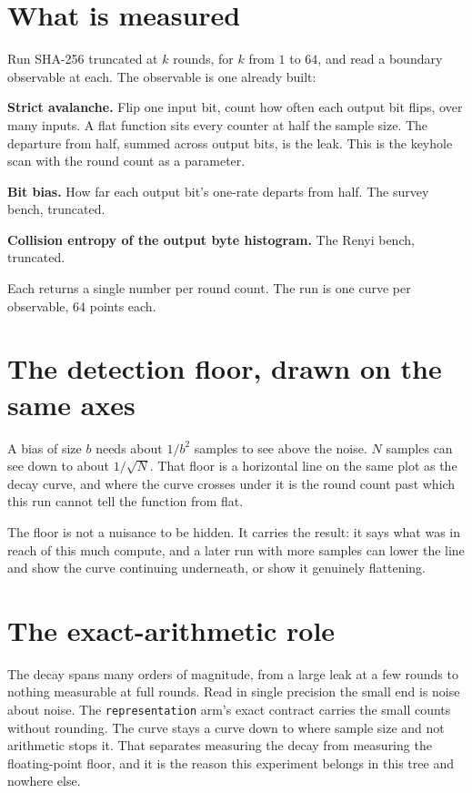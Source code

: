 \section{What is measured}

Run SHA-256 truncated at \(k\) rounds, for \(k\) from \(1\) to \(64\), and read a boundary observable at each. The observable is one already built:

\textbf{Strict avalanche.} Flip one input bit, count how often each output bit flips, over many inputs. A flat function sits every counter at half the sample size. The departure from half, summed across output bits, is the leak. This is the keyhole scan with the round count as a parameter.

\textbf{Bit bias.} How far each output bit's one-rate departs from half. The survey bench, truncated.

\textbf{Collision entropy of the output byte histogram.} The Renyi bench, truncated.

Each returns a single number per round count. The run is one curve per observable, \(64\) points each.

\section{The detection floor, drawn on the same axes}

A bias of size \(b\) needs about \(1/b^2\) samples to see above the noise. \(N\) samples can see down to about \(1/\sqrt{N}\). That floor is a horizontal line on the same plot as the decay curve, and where the curve crosses under it is the round count past which this run cannot tell the function from flat.

The floor is not a nuisance to be hidden. It carries the result: it says what was in reach of this much compute, and a later run with more samples can lower the line and show the curve continuing underneath, or show it genuinely flattening.

\section{The exact-arithmetic role}

The decay spans many orders of magnitude, from a large leak at a few rounds to nothing measurable at full rounds. Read in single precision the small end is noise about noise. The \texttt{representation} arm's exact contract carries the small counts without rounding. The curve stays a curve down to where sample size and not arithmetic stops it. That separates measuring the decay from measuring the floating-point floor, and it is the reason this experiment belongs in this tree and nowhere else.

